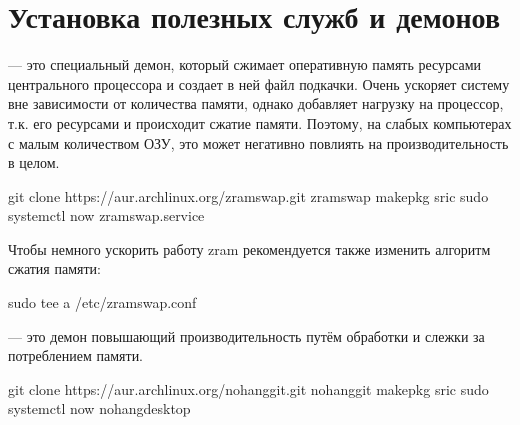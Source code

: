 \documentclass[letterpaper,10pt,russian,openany]{sphinxmanual}
\begin{document}
\section{Установка полезных служб и демонов}
\label{\detokenize{source/generic-system-acceleration:daemons-and-services}}\label{\detokenize{source/generic-system-acceleration:index-4}}\label{\detokenize{source/generic-system-acceleration:id3}}
\sphinxAtStartPar
{}  — это специальный демон,
который сжимает оперативную память ресурсами центрального процессора и создает в ней файл подкачки.
Очень ускоряет систему вне зависимости от количества памяти, однако добавляет нагрузку на процессор, т.к. его ресурсами и происходит сжатие памяти.
Поэтому, на слабых компьютерах с малым количеством ОЗУ, это может негативно повлиять на производительность в целом.

\begin{sphinxVerbatim}[commandchars=\\\{\}]
git clone https://aur.archlinux.org/zramswap.git  
 zramswap                                       
makepkg \PYGZhy{}sric                                     
sudo systemctl  \PYGZhy{}\PYGZhy{}now zramswap.service      
\end{sphinxVerbatim}

\sphinxAtStartPar
Чтобы немного ускорить работу zram рекомендуется также изменить алгоритм сжатия памяти:

\begin{sphinxVerbatim}[commandchars=\\\{\}]
   sudo tee \PYGZhy{}a /etc/zramswap.conf
\end{sphinxVerbatim}

\sphinxAtStartPar
{}   — это демон повышающий производительность путём обработки и слежки за потреблением памяти.

\begin{sphinxVerbatim}[commandchars=\\\{\}]
git clone https://aur.archlinux.org/nohang\PYGZhy{}git.git 
 nohang\PYGZhy{}git                                      
makepkg \PYGZhy{}sric                                      
sudo systemctl  \PYGZhy{}\PYGZhy{}now nohang\PYGZhy{}desktop         
\end{sphinxVerbatim}
\end{document}
